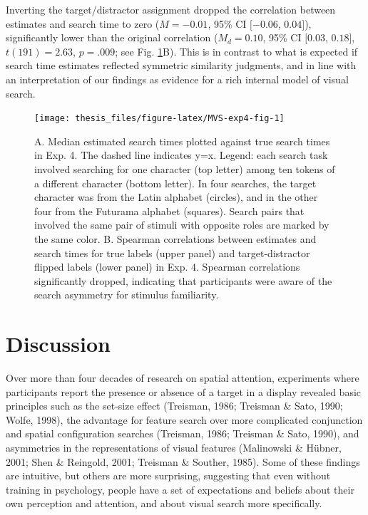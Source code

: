 \documentclass[12pt,twoside]{reedthesis}
\begin{document}
Inverting the target/distractor assignment dropped the correlation between estimates and search time to zero (\(M = -0.01\), 95\% CI \([-0.06\), \(0.04]\)), significantly lower than the original correlation (\(M_d = 0.10\), 95\% CI \([0.03\), \(0.18]\), \(t(191) = 2.63\), \(p = .009\); see Fig. \ref{fig:MVS-exp4-fig}B). This is in contrast to what is expected if search time estimates reflected symmetric similarity judgments, and in line with an interpretation of our findings as evidence for a rich internal model of visual search.
\begin{figure}
\texttt{[image: thesis\_files/figure-latex/MVS-exp4-fig-1]} \caption[Search time estimates accuracy and effect of search asymmetry, Experiment 4]{A. Median estimated search times plotted against true search times in Exp. 4. The dashed line indicates y=x. Legend: each search task involved searching for one character (top letter) among ten tokens of a different character (bottom letter). In four searches, the target character was from the Latin alphabet (circles), and in the other four from the Futurama alphabet (squares). Search pairs that involved the same pair of stimuli with opposite roles are marked by the same color. B. Spearman correlations between estimates and search times for true labels (upper panel) and target-distractor flipped labels (lower panel) in Exp. 4. Spearman correlations significantly dropped, indicating that participants were aware of the search asymmetry for stimulus familiarity.}\label{fig:MVS-exp4-fig}
\end{figure}
\hypertarget{discussion-1}{%
\section{Discussion}\label{discussion-1}}

Over more than four decades of research on spatial attention, experiments where participants report the presence or absence of a target in a display revealed basic principles such as the set-size effect (Treisman, 1986; Treisman \& Sato, 1990; Wolfe, 1998), the advantage for feature search over more complicated conjunction and spatial configuration searches (Treisman, 1986; Treisman \& Sato, 1990), and asymmetries in the representations of visual features (Malinowski \& Hübner, 2001; Shen \& Reingold, 2001; Treisman \& Souther, 1985). Some of these findings are intuitive, but others are more surprising, suggesting that even without training in psychology, people have a set of expectations and beliefs about their own perception and attention, and about visual search more specifically.
\end{document}
